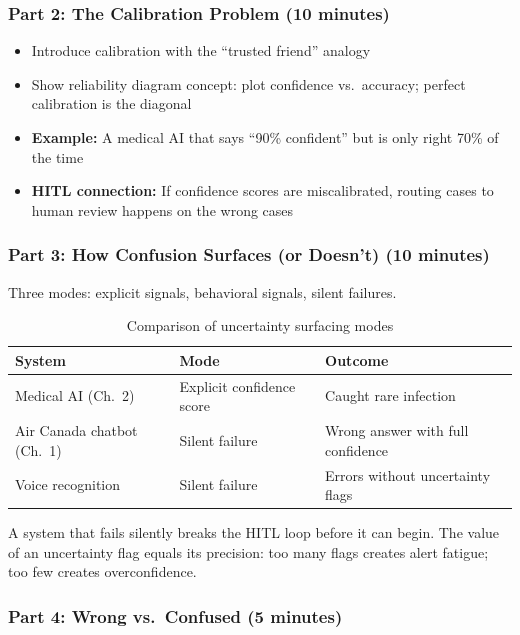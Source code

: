 \subsubsection{Part 2: The Calibration Problem (10 minutes)}

\begin{itemize}
    \item Introduce calibration with the ``trusted friend'' analogy
    \item Show reliability diagram concept: plot confidence vs.\ accuracy; perfect calibration is the diagonal
    \item \textbf{Example:} A medical AI that says ``90\% confident'' but is only right 70\% of the time
    \item \textbf{HITL connection:} If confidence scores are miscalibrated, routing cases to human review happens on the wrong cases
\end{itemize}

\subsubsection{Part 3: How Confusion Surfaces (or Doesn't) (10 minutes)}

Three modes: explicit signals, behavioral signals, silent failures.

\begin{table}[htbp]
\caption{Comparison of uncertainty surfacing modes}
\label{tab:surfacing-modes}
\centering
\begin{tabular}{@{}lll@{}}
\toprule
\textbf{System} & \textbf{Mode} & \textbf{Outcome} \\
\midrule
Medical AI (Ch.\ 2) & Explicit confidence score & Caught rare infection \\
Air Canada chatbot (Ch.\ 1) & Silent failure & Wrong answer with full confidence \\
Voice recognition & Silent failure & Errors without uncertainty flags \\
\bottomrule
\end{tabular}
\end{table}

\begin{keyconcept}
A system that fails silently breaks the HITL loop before it can begin. The value of an uncertainty flag equals its precision: too many flags creates alert fatigue; too few creates overconfidence.
\end{keyconcept}

\subsubsection{Part 4: Wrong vs.\ Confused (5 minutes)}

